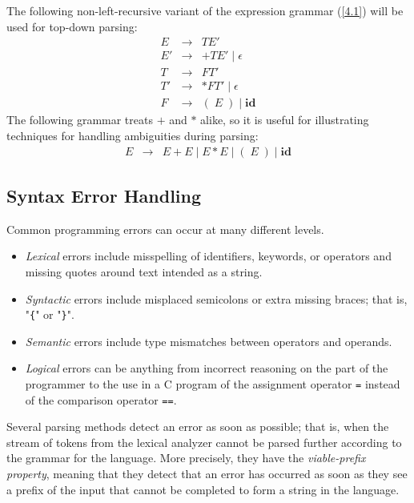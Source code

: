 \documentclass[a4paper,twoside]{book}
\begin{document}
The following non-left-recursive variant of the expression grammar (\ref{4.1}) will be used for top-down parsing:
\begin{equation}
    \begin{array}{ccl}E&\rightarrow&TE'\\E'&\rightarrow&+TE'\;|\;\epsilon\\T&\rightarrow&FT'\\T'&\rightarrow&*FT'\;|\;\epsilon\\F&\rightarrow&(\;E\;)\;|\;\textbf{id}\end{array}
    \label{4.2}
\end{equation}
The following grammar treats $+$ and $*$ alike, so it is useful for illustrating techniques for handling ambiguities during parsing:
\begin{equation}
    \begin{array}{ccc}E&\rightarrow&E+E\;|\;E*E\;|\;(\;E\;)\;|\;\textbf{id}\end{array}
    \label{4.3}
\end{equation}

\subsection{Syntax Error Handling}

Common programming errors can occur at many different levels.
\begin{itemize}
    \item\textit{Lexical} errors include misspelling of identifiers, keywords, or operators and missing quotes around text intended as a string.
    \item\textit{Syntactic} errors include misplaced semicolons or extra missing braces; that is, "\verb|{|" or "\verb|}|".
    \item\textit{Semantic} errors include type mismatches between operators and operands.
    \item\textit{Logical} errors can be anything from incorrect reasoning on the part of the programmer to the use in a C program of the assignment operator \verb|=| instead of the comparison operator \verb|==|.
\end{itemize}

Several parsing methods detect an error as soon as possible; that is, when the stream of tokens from the lexical analyzer cannot be parsed further according to the grammar for the language. More precisely, they have the \textit{viable-prefix property}, meaning that they detect that an error has occurred as soon as they see a prefix of the input that cannot be completed to form a string in the language.
\end{document}
